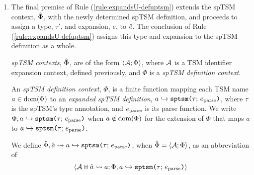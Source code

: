 {{{{\begin{enumerate}
\item The final premise of Rule (\ref{rule:expandsU-defuptsm}) extends the spTSM context, $\hat\Phi$, with the newly determined {spTSM definition}, and proceeds to assign a type, $\tau'$, and expansion, $e$, to ${\hat e}$. The conclusion of Rule (\ref{rule:expandsU-defuptsm}) assigns this type and expansion to the spTSM definition as a whole.%



\emph{spTSM contexts}, $\hat\Phi$, are of the form $\langle \mathcal{A}; \Phi \rangle$, where $\mathcal{A}$ is a {TSM identifier expansion context}, defined previously, and $\Phi$ is a \emph{spTSM definition context}. 


An \emph{spTSM definition context}, $\Phi$, is a finite function mapping each TSM name $a \in \text{dom}(\Phi)$ to an \emph{expanded spTSM definition}, $a \hookrightarrow \texttt{sptsm}\texttt{(}\tau;\,e_\text{parse}\texttt{)}$, where $\tau$ is the spTSM's type annotation, and $e_\text{parse}$ is its parse function. We write $\Phi, a \hookrightarrow \texttt{sptsm}\texttt{(}\tau;\,e_\text{parse}\texttt{)}$ when $a \notin \text{dom}(\Phi)$ for the extension of $\Phi$ that maps $a$ to $a \hookrightarrow \texttt{sptsm}\texttt{(}\tau;\,e_\text{parse}\texttt{)}$. %


We define $\hat\Phi, \hat{a} \leadsto a \hookrightarrow \texttt{sptsm}\texttt{(}\tau;\,e_\text{parse}\texttt{)}$, when $\hat\Phi=\langle \mathcal{A}; \Phi \rangle$, as an abbreviation of \[\langle \mathcal{A} \uplus \hat{a} \leadsto a; \Phi, a \hookrightarrow \texttt{sptsm}\texttt{(}\tau;\,e_\text{parse}\texttt{)} \rangle\]
\end{enumerate}
}}}}
